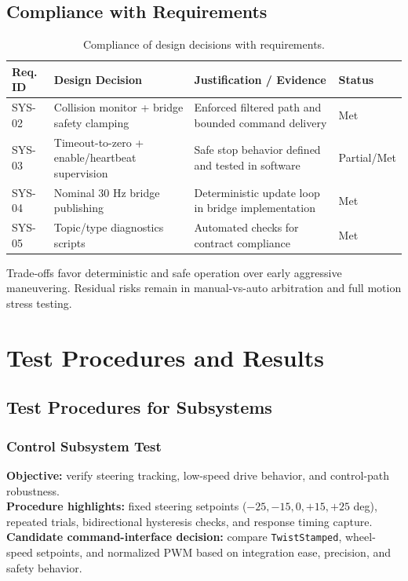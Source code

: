 \documentclass[12pt,a4paper]{report}
\begin{document}
\section{Compliance with Requirements}
\begin{table}[H]
\centering
\caption{Compliance of design decisions with requirements.}
\label{tab:design_compliance}
\begin{tabularx}{\textwidth}{|p{2cm}|X|X|p{1.8cm}|}
\hline
\textbf{Req. ID} & \textbf{Design Decision} & \textbf{Justification / Evidence} & \textbf{Status} \\
\hline
SYS-02 & Collision monitor + bridge safety clamping & Enforced filtered path and bounded command delivery & Met \\
\hline
SYS-03 & Timeout-to-zero + enable/heartbeat supervision & Safe stop behavior defined and tested in software & Partial/Met \\
\hline
SYS-04 & Nominal 30 Hz bridge publishing & Deterministic update loop in bridge implementation & Met \\
\hline
SYS-05 & Topic/type diagnostics scripts & Automated checks for contract compliance & Met \\
\hline
\end{tabularx}
\end{table}

Trade-offs favor deterministic and safe operation over early aggressive maneuvering. Residual risks remain in manual-vs-auto arbitration and full motion stress testing.

\chapter{Test Procedures and Results}

\section{Test Procedures for Subsystems}

\subsection{Control Subsystem Test}
\textbf{Objective:} verify steering tracking, low-speed drive behavior, and control-path robustness.\\
\textbf{Procedure highlights:} fixed steering setpoints ($-25,-15,0,+15,+25$ deg), repeated trials, bidirectional hysteresis checks, and response timing capture.\\
\textbf{Candidate command-interface decision:} compare \texttt{TwistStamped}, wheel-speed setpoints, and normalized PWM based on integration ease, precision, and safety behavior.
\end{document}
